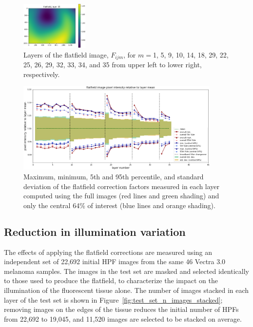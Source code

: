 \documentclass[letterpaper,11pt]{article}
\newcommand{\reffig}[1]{Figure~\ref{#1}}
\begin{document}
\begin{figure}[!ht]
\includegraphics[width=0.3\textwidth]{images/results/flatfield_layers/flatfield_layer_35}
\caption{\footnotesize Layers of the flatfield image, $F_{ijm}$, for $m=$1, 5, 9, 10, 14, 18, 29, 22, 25, 26, 29, 32, 33, 34, and 35 from upper left to lower right, respectively.}
\label{fig:flatfield_image_layers}
\end{figure}

\begin{figure}[!ht]
\centering
\includegraphics[width=0.90\textwidth]{images/results/flatfield_pixel_intensities}
\caption{\footnotesize Maximum, minimum, 5th and 95th percentile, and standard deviation of the flatfield correction factors measured in each layer computed using the full images (red lines and green shading) and only the central 64\% of interest (blue lines and orange shading).}
\label{fig:flatfield_pixel_intensities}
\end{figure} 

\subsection{Reduction in illumination variation}
\label{ssec:reduction_in_illumination_variation}

The effects of applying the flatfield corrections are measured using an independent set of 22,692 initial HPF images from the same 46 Vectra 3.0 melanoma samples. The images in the test set are masked and selected identically to those used to produce the flatfield, to characterize the impact on the illumination of the fluorescent tissue alone. The number of images stacked in each layer of the test set is shown in \reffig{fig:test_set_n_images_stacked}; removing images on the edges of the tissue reduces the initial number of HPFs from 22,692 to 19,045, and 11,520 images are selected to be stacked on average.
\end{document}
